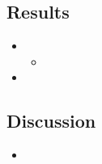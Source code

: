 \documentclass[10pt,letter]{article}
\begin{document}
\subsection*{Results}
\begin{itemize}
    \item
    \begin{itemize}
        \item
    \end{itemize}
    \item
\end{itemize}
\subsection*{Discussion}
\begin{itemize}
    \item
\end{itemize}
\printbibliography
\end{document}
